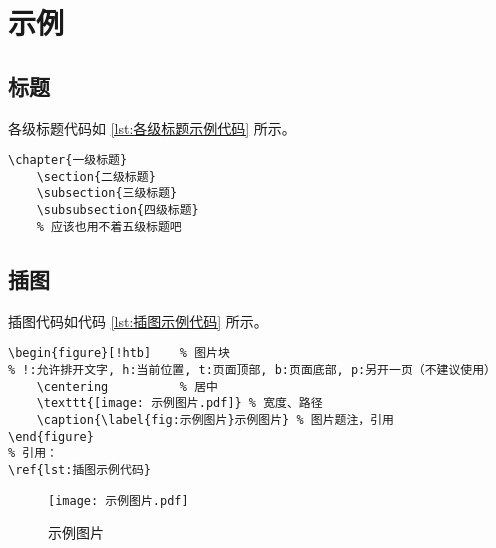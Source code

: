 \section{示例}

\subsection{标题}

各级标题代码如 \ref{lst:各级标题示例代码} 所示。

\begin{lstlisting}[caption=各级标题示例 \LaTeX 代码,label=lst:各级标题示例代码]
    \chapter{一级标题}
    \section{二级标题}
    \subsection{三级标题}
    \subsubsection{四级标题}
    % 应该也用不着五级标题吧
\end{lstlisting}

\subsection{插图}

插图代码如代码 \ref{lst:插图示例代码} 所示。

\begin{lstlisting}[caption=插图示例 \LaTeX 代码,label=lst:插图示例代码]
\begin{figure}[!htb]    % 图片块
% !:允许排开文字, h:当前位置, t:页面顶部, b:页面底部, p:另开一页（不建议使用）
    \centering          % 居中
    \texttt{[image: 示例图片.pdf]} % 宽度、路径
    \caption{\label{fig:示例图片}示例图片} % 图片题注，引用
\end{figure}
% 引用：
\ref{lst:插图示例代码}
\end{lstlisting}

\begin{figure}[!htb]
    \centering
    \texttt{[image: 示例图片.pdf]}
    \caption{\label{fig:示例图片}示例图片}
\end{figure}

